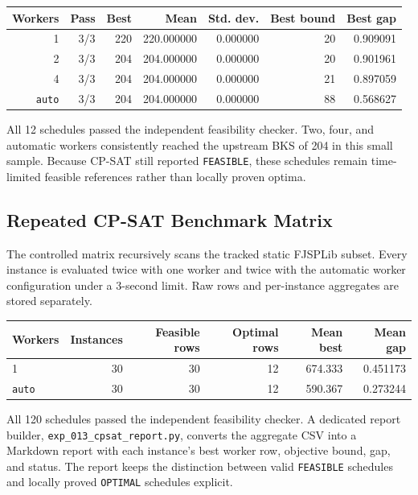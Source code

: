 ﻿\documentclass[11pt]{article}
\begin{document}
\begin{table}[h]
\centering
\begin{tabular}{rrrrrrr}
\toprule
Workers & Pass & Best & Mean & Std. dev. & Best bound & Best gap \\
\midrule
1 & 3/3 & 220 & 220.000000 & 0.000000 & 20 & 0.909091 \\
2 & 3/3 & 204 & 204.000000 & 0.000000 & 20 & 0.901961 \\
4 & 3/3 & 204 & 204.000000 & 0.000000 & 21 & 0.897059 \\
\texttt{auto} & 3/3 & 204 & 204.000000 & 0.000000 & 88 & 0.568627 \\
\bottomrule
\end{tabular}
\end{table}

All 12 schedules passed the independent feasibility checker. Two, four, and
automatic workers consistently reached the upstream BKS of 204 in this small
sample. Because CP-SAT still reported \texttt{FEASIBLE}, these schedules remain
time-limited feasible references rather than locally proven optima.

\subsection{Repeated CP-SAT Benchmark Matrix}

The controlled matrix recursively scans the tracked static FJSPLib subset.
Every instance is evaluated twice with one worker and twice with the automatic
worker configuration under a 3-second limit. Raw rows and per-instance
aggregates are stored separately.

\begin{table}[h]
\centering
\begin{tabular}{lrrrrr}
\toprule
Workers & Instances & Feasible rows & Optimal rows & Mean best & Mean gap \\
\midrule
1 & 30 & 30 & 12 & 674.333 & 0.451173 \\
\texttt{auto} & 30 & 30 & 12 & 590.367 & 0.273244 \\
\bottomrule
\end{tabular}
\end{table}

All 120 schedules passed the independent feasibility checker. A dedicated
report builder, \texttt{exp\_013\_cpsat\_report.py}, converts the aggregate CSV
into a Markdown report with each instance's best worker row, objective bound,
gap, and status. The report keeps the distinction between valid
\texttt{FEASIBLE} schedules and locally proved \texttt{OPTIMAL} schedules
explicit.
\end{document}
